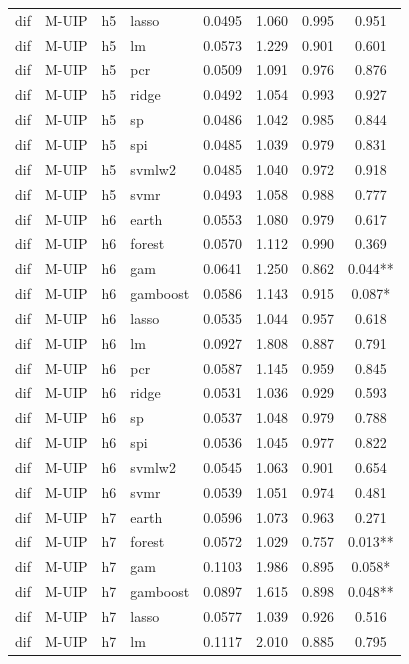\begin{ThreePartTable}
\begin{longtable}[t]{llclcccc}
dif & M-UIP & h5 & lasso & 0.0495 & 1.060 & 0.995 & 0.951\\
dif & M-UIP & h5 & lm & 0.0573 & 1.229 & 0.901 & 0.601\\
dif & M-UIP & h5 & pcr & 0.0509 & 1.091 & 0.976 & 0.876\\
dif & M-UIP & h5 & ridge & 0.0492 & 1.054 & 0.993 & 0.927\\
dif & M-UIP & h5 & sp & 0.0486 & 1.042 & 0.985 & 0.844\\
dif & M-UIP & h5 & spi & 0.0485 & 1.039 & 0.979 & 0.831\\
dif & M-UIP & h5 & svmlw2 & 0.0485 & 1.040 & 0.972 & 0.918\\
dif & M-UIP & h5 & svmr & 0.0493 & 1.058 & 0.988 & 0.777\\
\addlinespace
dif & M-UIP & h6 & earth & 0.0553 & 1.080 & 0.979 & 0.617\\
dif & M-UIP & h6 & forest & 0.0570 & 1.112 & 0.990 & 0.369\\
dif & M-UIP & h6 & gam & 0.0641 & 1.250 & 0.862 & 0.044**\\
dif & M-UIP & h6 & gamboost & 0.0586 & 1.143 & 0.915 & 0.087*\\
dif & M-UIP & h6 & lasso & 0.0535 & 1.044 & 0.957 & 0.618\\
dif & M-UIP & h6 & lm & 0.0927 & 1.808 & 0.887 & 0.791\\
dif & M-UIP & h6 & pcr & 0.0587 & 1.145 & 0.959 & 0.845\\
dif & M-UIP & h6 & ridge & 0.0531 & 1.036 & 0.929 & 0.593\\
dif & M-UIP & h6 & sp & 0.0537 & 1.048 & 0.979 & 0.788\\
dif & M-UIP & h6 & spi & 0.0536 & 1.045 & 0.977 & 0.822\\
dif & M-UIP & h6 & svmlw2 & 0.0545 & 1.063 & 0.901 & 0.654\\
dif & M-UIP & h6 & svmr & 0.0539 & 1.051 & 0.974 & 0.481\\
\addlinespace
dif & M-UIP & h7 & earth & 0.0596 & 1.073 & 0.963 & 0.271\\
dif & M-UIP & h7 & forest & 0.0572 & 1.029 & 0.757 & 0.013**\\
dif & M-UIP & h7 & gam & 0.1103 & 1.986 & 0.895 & 0.058*\\
dif & M-UIP & h7 & gamboost & 0.0897 & 1.615 & 0.898 & 0.048**\\
dif & M-UIP & h7 & lasso & 0.0577 & 1.039 & 0.926 & 0.516\\
dif & M-UIP & h7 & lm & 0.1117 & 2.010 & 0.885 & 0.795\\

\end{longtable}
\end{ThreePartTable}
